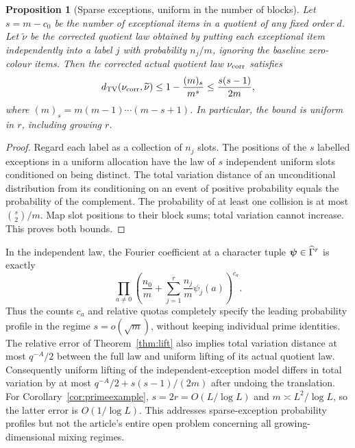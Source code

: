 \documentclass[11pt]{article}
\newtheorem{proposition}[theorem]{Proposition}
\theoremstyle{remark}\newtheorem{remark}[theorem]{Remark}
\begin{document}
\begin{proposition}[Sparse exceptions, uniform in the number of blocks]\label{prop:iid}
Let $s=m-c_0$ be the number of exceptional items in a quotient of any fixed order $d$. Let $\widetilde\nu$ be the corrected quotient law obtained by putting each exceptional item independently into a label $j$ with probability $n_j/m$, ignoring the baseline zero-colour items. Then the corrected actual quotient law $\nu_{\rm corr}$ satisfies
\begin{equation}\label{eq:tv}
 d_{\rm TV}(\nu_{\rm corr},\widetilde\nu)\le 1-\frac{(m)_s}{m^s}\le \frac{s(s-1)}{2m},
\end{equation}
where $(m)_s=m(m-1)\cdots(m-s+1)$. In particular, the bound is uniform in $r$, including growing $r$.
\end{proposition}
\begin{proof}
Regard each label as a collection of $n_j$ slots. The positions of the $s$ labelled exceptions in a uniform allocation have the law of $s$ independent uniform slots conditioned on being distinct. The total variation distance of an unconditional distribution from its conditioning on an event of positive probability equals the probability of the complement. The probability of at least one collision is at most $\binom{s}{2}/m$. Map slot positions to their block sums; total variation cannot increase. This proves both bounds.
\end{proof}

In the independent law, the Fourier coefficient at a character tuple $\boldsymbol\psi\in\widehat{\Gamma}^r$ is exactly
\[
 \prod_{a\ne0}\left(\frac{n_0}{m}+\sum_{j=1}^r\frac{n_j}{m}\psi_j(a)\right)^{c_a}.
\]
Thus the counts $c_a$ and relative quotas completely specify the leading probability profile in the regime $s=o(\sqrt m)$, without keeping individual prime identities. The relative error of Theorem~\ref{thm:lift} also implies total variation distance at most $q^{-A}/2$ between the full law and uniform lifting of its actual quotient law. Consequently uniform lifting of the independent-exception model differs in total variation by at most $q^{-A}/2+s(s-1)/(2m)$ after undoing the translation. For Corollary~\ref{cor:primeexample}, $s=2r=O(L/\log L)$ and $m\asymp L^2/\log L$, so the latter error is $O(1/\log L)$. This addresses sparse-exception probability profiles but not the article's entire open problem concerning all growing-dimensional mixing regimes.
\end{document}

